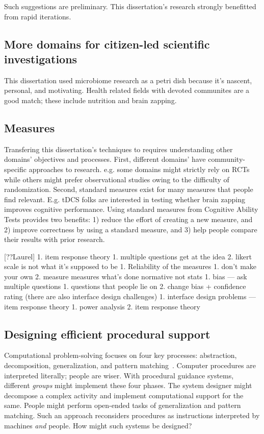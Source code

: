 Such suggestions are preliminary. This dissertation's research strongly benefitted from rapid iterations.

\subsection{More domains for citizen-led scientific investigations}

This dissertation used microbiome research as a petri dish because it’s nascent, personal, and motivating. Health related fields with devoted communites are a good match; these include nutrition and brain zapping. 

\subsection{Measures}
Transfering this dissertation's techniques to requires understanding other domains' objectives and processes. First, different domains' have community-specific approaches to research. e.g. some domains might strictly rely on RCTs while others might prefer observational studies owing to the difficulty of randomization. Second, standard measures exist for many measures that people find relevant. E.g. tDCS folks are interested in testing whether brain zapping improves cognitive performance.  Using standard measures from Cognitive Ability Tests provides two benefits: 1) reduce the effort of creating a new measure, and 2) improve correctness by using a standard measure, and 3) help people compare their results with prior research.

[??Laurel] 1. item response theory
    1. multiple questions get at the idea
    2. likert scale is not what it’s supposed to be
1. Reliability of the measures
    1. don’t make your own
    2. measure measures what’s done
normative not stats
1. bias — ask multiple questions
    1. questions that people lie on
    2. change bias + confidence rating 
(there are also interface design challenges)
1. interface design problems — item response theory
    1. power analysis 
    2. item response theory

\subsection{Designing efficient procedural support}
Computational problem-solving focuses on four key processes: abstraction, decomposition, generalization, and pattern matching~\cite{Wing2006}. Computer procedures are interpreted literally; people are wiser. With procedural guidance systems, different \textit{groups} might implement these four phases. The system designer might decompose a complex activity and implement computational support for the same. People might perform open-ended tasks of generalization and pattern matching. Such an approach reconsiders procedures as instructions interpreted by machines \textit{and} people. How might such systems be designed?

